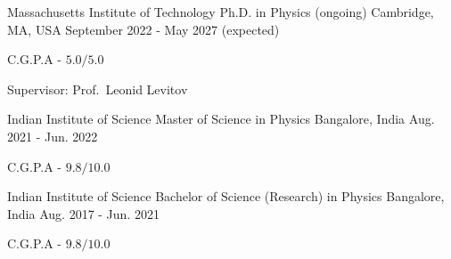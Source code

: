 

\begin{cventries}

    \cventry
	{Massachusetts Institute of Technology} %
	{Ph.D. in Physics (ongoing)} %
	{Cambridge, MA, USA} %
	{September 2022 - May 2027 (expected)} %
	{
	\begin{cvitems} %
		\item {C.G.P.A - $5.0/5.0$} \\
	\end{cvitems}
	\vspace{-3mm}
	Supervisor: Prof.\ Leonid Levitov
	}

    \cventry
	{Indian Institute of Science} %
	{Master of Science in Physics} %
	{Bangalore, India} %
	{Aug. 2021 - Jun. 2022} %
	{
	\begin{cvitems} %
		\item {C.G.P.A - $9.8/10.0$}
	\end{cvitems}
	}

  \cventry
    {Indian Institute of Science} %
    {Bachelor of Science (Research) in Physics} %
    {Bangalore, India} %
    {Aug. 2017 - Jun. 2021} %
    {
      \begin{cvitems} %
        \item {C.G.P.A - $9.8/10.0$}
      \end{cvitems}
    }




\end{cventries}
